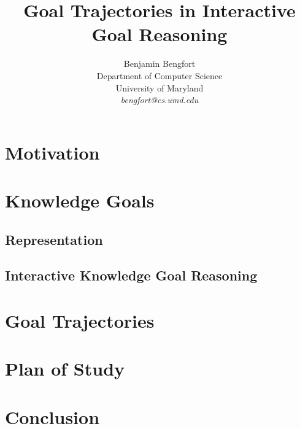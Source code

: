 \documentclass[letterpaper]{article}
\title{Goal Trajectories in Interactive Goal Reasoning}
\author{Benjamin Bengfort\\
Department of Computer Science\\
University of Maryland\\
\textit{bengfort@cs.umd.edu}\\
}
\begin{document}
    \maketitle

\section{Motivation}

\section{Knowledge Goals}

\subsection{Representation}

\subsection{Interactive Knowledge Goal Reasoning}

\section{Goal Trajectories}

\section{Plan of Study}

\section{Conclusion}



\end{document}
